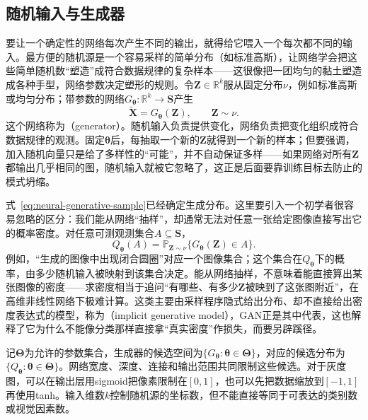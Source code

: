 \subsection{随机输入与生成器}
\label{sec:neural-generative-sampling}

要让一个确定性的网络每次产生不同的输出，就得给它喂入一个每次都不同的输入。最方便的随机源是一个容易采样的简单分布（如标准高斯），让网络学会把这些简单随机数“塑造”成符合数据规律的复杂样本——这很像把一团均匀的黏土塑造成各种手型，网络参数决定塑形的规则。令$\bm{Z}\in\mathbb{R}^{k}$服从固定分布$\nu$，例如标准高斯或均匀分布；带参数的网络$G_{\bm{\theta}}:\mathbb{R}^{k}\to\bm{S}$产生
\begin{equation}
  \label{eq:neural-generative-sample}
  \widetilde{\bm{X}}=G_{\bm{\theta}}(\bm{Z}),\qquad \bm{Z}\sim\nu.
\end{equation}
这个网络称为（generator）。随机输入负责提供变化，网络负责把变化组织成符合数据规律的观测。固定$\bm{\theta}$后，每抽取一个新的$\bm{Z}$就得到一个新的样本；但要强调，加入随机向量只是给了多样性的“可能”，并不自动保证多样——如果网络对所有$\bm{Z}$都输出几乎相同的图，随机输入就被它忽略了，这正是后面要靠训练目标去防止的模式坍缩。

式~\eqref{eq:neural-generative-sample}已经确定生成分布。这里要引入一个初学者很容易忽略的区分：我们能从网络“抽样”，却通常无法对任意一张给定图像直接写出它的概率密度。对任意可测观测集合$A\subseteq\bm{S}$，
\begin{equation}
  \label{eq:neural-generative-distribution}
  Q_{\bm{\theta}}(A)=\mathbb{P}_{\bm{Z}\sim\nu}
    \{G_{\bm{\theta}}(\bm{Z})\in A\}.
\end{equation}
例如，“生成的图像中出现闭合圆圈”对应一个图像集合；这个集合在$Q_{\bm{\theta}}$下的概率，由多少随机输入被映射到该集合决定。能从网络抽样，不意味着能直接算出某张图像的密度——求密度相当于追问“有哪些、有多少$\bm Z$被映到了这张图附近”，在高维非线性网络下极难计算。这类主要由采样程序隐式给出分布、却不直接给出密度表达式的模型，称为（implicit generative model），GAN正是其中代表，这也解释了它为什么不能像分类那样直接拿“真实密度”作损失，而要另辟蹊径。

记$\bm{\Theta}$为允许的参数集合，生成器的候选空间为$\{G_{\bm{\theta}}:\bm{\theta}\in\bm{\Theta}\}$，对应的候选分布为$\{Q_{\bm{\theta}}:\bm{\theta}\in\bm{\Theta}\}$。网络宽度、深度、连接和输出范围共同限制这些候选。对于灰度图，可以在输出层用sigmoid把像素限制在$[0,1]$，也可以先把数据缩放到$[-1,1]$再使用tanh。输入维数$k$控制随机源的坐标数，但不能直接等同于可表达的类别数或视觉因素数。

